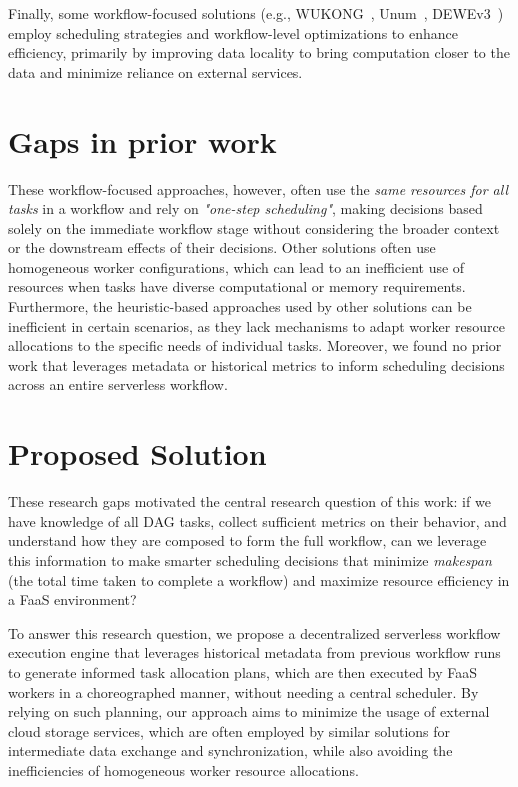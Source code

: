 Finally, some workflow-focused solutions (e.g., WUKONG~\cite{wukong_2}, Unum~\cite{unum_decentralized_orchestrator}, DEWEv3~\cite{dewe_v3}) employ scheduling strategies and workflow-level optimizations to enhance efficiency, primarily by improving data locality to bring computation closer to the data and minimize reliance on external services.

\section{Gaps in prior work}
These workflow-focused approaches, however, often use the \textit{same resources for all tasks} in a workflow and rely on \textit{"one-step scheduling"}, making decisions based solely on the immediate workflow stage without considering the broader context or the downstream effects of their decisions. Other solutions often use homogeneous worker configurations, which can lead to an inefficient use of resources when tasks have diverse computational or memory requirements. Furthermore, the heuristic-based approaches used by other solutions can be inefficient in certain scenarios, as they lack mechanisms to adapt worker resource allocations to the specific needs of individual tasks. Moreover, we found no prior work that leverages metadata or historical metrics to inform scheduling decisions across an entire serverless workflow.

\section{Proposed Solution}
These research gaps motivated the central research question of this work: if we have knowledge of all DAG tasks, collect sufficient metrics on their behavior, and understand how they are composed to form the full workflow, can we leverage this information to make smarter scheduling decisions that minimize \textit{makespan} (the total time taken to complete a workflow) and maximize resource efficiency in a FaaS environment?

To answer this research question, we propose a decentralized serverless workflow execution engine that leverages historical metadata from previous workflow runs to generate informed task allocation plans, which are then executed by FaaS workers in a choreographed manner, without needing a central scheduler. By relying on such planning, our approach aims to minimize the usage of external cloud storage services, which are often employed by similar solutions for intermediate data exchange and synchronization, while also avoiding the inefficiencies of homogeneous worker resource allocations.

